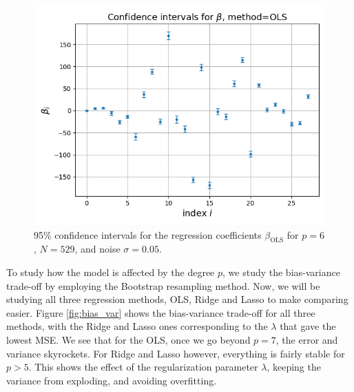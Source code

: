 \documentclass[a4paper]{article}
\begin{document}
\begin{figure}[H]
	\centering
	\includegraphics[scale=0.5]{../figures/task_a/beta_conf_int_OLS_N529_nf23_p6_noise0.05_seed4155_beta28.png}
	\caption{95\% confidence intervals for the regression coefficients $\beta_{\text{OLS}}$ for $p=6$, $N=529$, and noise $\sigma=0.05$.}
	\label{fig:confbetaOLS}
\end{figure}
To study how the model is affected by the degree $p$, we study the bias-variance trade-off by employing the Bootstrap resampling method. Now, we will be studying all three regression methods, OLS, Ridge and Lasso to make comparing easier. 
Figure \ref{fig:bias_var} shows the bias-variance trade-off for all three methods, with the Ridge and Lasso ones corresponding to the $\lambda$ that gave the lowest MSE. We see that for the OLS, once we go beyond $p=7$, the error and variance skyrockets. For Ridge and Lasso however, everything is fairly stable for $p>5$. This shows the effect of the regularization parameter $\lambda$, keeping the variance from exploding, and avoiding overfitting.
\end{document}
